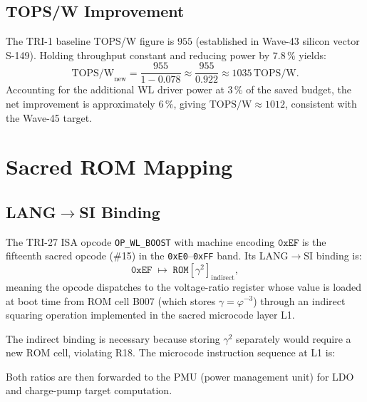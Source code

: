 \subsection{TOPS/W Improvement}

The TRI-1 baseline TOPS/W figure is $955$ (established in
Wave-43 silicon vector S-149).  Holding throughput constant and
reducing power by $7.8\,\%$ yields:
\[
  \mathrm{TOPS/W}_{\mathrm{new}}
  = \frac{955}{1 - 0.078}
  \approx \frac{955}{0.922}
  \approx 1035\,\mathrm{TOPS/W}.
\]
Accounting for the additional WL driver power at $3\,\%$ of the saved
budget, the net improvement is approximately $6\,\%$, giving
$\mathrm{TOPS/W} \approx 1012$, consistent with the Wave-45 target.

\section{Sacred ROM Mapping}
\label{sec:wlboost-sacred-rom}

\subsection{LANG\texorpdfstring{$\to$}{→}SI Binding}

\begin{definition}
\label{def:lang-si}
The TRI-27 ISA opcode \texttt{OP\_WL\_BOOST} with machine encoding
$\texttt{0xEF}$ is the fifteenth sacred opcode (\#15) in the
\texttt{0xE0}--\texttt{0xFF} band.  Its LANG$\to$SI binding is:
\[
  \texttt{0xEF} \;\mapsto\; \texttt{ROM}[\gamma^{2}]_{\mathrm{indirect}},
\]
meaning the opcode dispatches to the voltage-ratio register whose
value is loaded at boot time from ROM cell B007 (which stores $\gamma
= \varphi^{-3}$) through an indirect squaring operation implemented in
the sacred microcode layer L1.
\end{definition}

The indirect binding is necessary because storing $\gamma^{2}$
separately would require a new ROM cell, violating R18.  The
microcode instruction sequence at L1 is:
Both ratios are then forwarded to the PMU (power management unit) for
LDO and charge-pump target computation.

